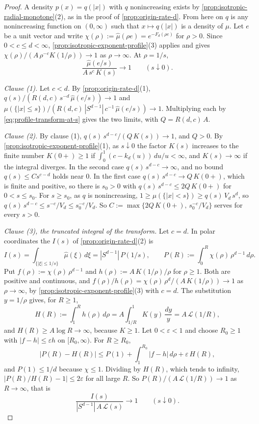 \begin{proof}
\leanok
A density $p(x) = q(|x|)$ with $q$ nonincreasing exists by
\ref{prop:isotropic-radial-monotone}(2), as in the proof of \ref{prop:origin-rate-d}. From here on
$q$ is any nonincreasing function on $(0,\infty)$ such that $x \mapsto q(|x|)$ is a density of
$\mu$. Let $e$ be a unit vector and write $\chi(\rho) := \widehat\mu(\rho e) = e^{-F_d(\rho e)}$
for $\rho > 0$. Since $0 < c \le d < \infty$, \ref{prop:isotropic-exponent-profile}(3) applies and
gives $\chi(\rho)/(A\,\rho^{-c}K(1/\rho)) \to 1$ as $\rho \to \infty$. At $\rho = 1/s$,
\begin{equation}\label{eq:profile-transform-at-s}
  \frac{\widehat\mu(e/s)}{A\,s^{c}\,K(s)} \to 1 \qquad (s \downarrow 0) .
\end{equation}

\emph{Clause (1).} Let $c < d$. By \ref{prop:origin-rate-d}(1),
$q(s)/(R(d,c)\,s^{-d}\,\widehat\mu(e/s)) \to 1$ and
$\mu(\{|x| \le s\})/(R(d,c)\,|S^{d-1}|\,c^{-1}\,\widehat\mu(e/s)) \to 1$. Multiplying each by
\ref{eq:profile-transform-at-s} gives the two limits, with $Q = R(d,c)\,A$.

\emph{Clause (2).} By clause (1), $q(s)\,s^{d-c}/(Q\,K(s)) \to 1$, and $Q > 0$. By
\ref{prop:isotropic-exponent-profile}(1), as $s \downarrow 0$ the factor $K(s)$ increases to the
finite number $K(0{+}) \ge 1$ if $\int_0^1(c - k_d(u))\,du/u < \infty$, and $K(s) \to \infty$ if
the integral diverges. In the second case $q(s)\,s^{d-c} \to \infty$, and no bound
$q(s) \le C s^{c-d}$ holds near $0$. In the first case $q(s)\,s^{d-c} \to Q\,K(0{+})$, which is
finite and positive, so there is $s_0 > 0$ with
$q(s)\,s^{d-c} \le 2Q\,K(0{+})$ for $0 < s \le s_0$. For $s \ge s_0$, as $q$ is nonincreasing,
$1 \ge \mu(\{|x| < s\}) \ge q(s)\,V_d\,s^{d}$, so
$q(s)\,s^{d-c} \le s^{-c}/V_d \le s_0^{-c}/V_d$. So
$C := \max\{2Q\,K(0{+}),\,s_0^{-c}/V_d\}$ serves for every $s > 0$.

\emph{Clause (3), the truncated integral of the transform.} Let $c = d$. In polar coordinates the
$I(s)$ of \ref{prop:origin-rate-d}(2) is
\[
  I(s) = \int_{\{|\xi| \le 1/s\}}\widehat\mu(\xi)\,d\xi = |S^{d-1}|\,P(1/s), \qquad
  P(R) := \int_0^R \chi(\rho)\,\rho^{d-1}\,d\rho .
\]
Put $f(\rho) := \chi(\rho)\,\rho^{d-1}$ and $h(\rho) := A\,K(1/\rho)/\rho$ for $\rho \ge 1$. Both
are positive and continuous, and $f(\rho)/h(\rho) = \chi(\rho)\,\rho^{d}/(A\,K(1/\rho)) \to 1$
as $\rho \to \infty$, by \ref{prop:isotropic-exponent-profile}(3) with $c = d$. The substitution
$y = 1/\rho$ gives, for $R \ge 1$,
\[
  H(R) := \int_1^R h(\rho)\,d\rho = A\int_{1/R}^{1}K(y)\,\frac{dy}{y} = A\,\mathcal{L}(1/R) ,
\]
and $H(R) \ge A\log R \to \infty$, because $K \ge 1$. Let $0 < \varepsilon < 1$ and choose
$R_0 \ge 1$ with $|f - h| \le \varepsilon h$ on $[R_0,\infty)$. For $R \ge R_0$,
\[
  \bigl|P(R) - H(R)\bigr| \le P(1) + \int_1^{R_0}|f - h|\,d\rho + \varepsilon\,H(R) ,
\]
and $P(1) \le 1/d$ because $\chi \le 1$. Dividing by $H(R)$, which tends to infinity,
$|P(R)/H(R) - 1| \le 2\varepsilon$ for all large $R$. So $P(R)/(A\,\mathcal{L}(1/R)) \to 1$ as
$R \to \infty$, that is
\[
  \frac{I(s)}{|S^{d-1}|\,A\,\mathcal{L}(s)} \to 1 \qquad (s \downarrow 0) .
\]


\end{proof}
